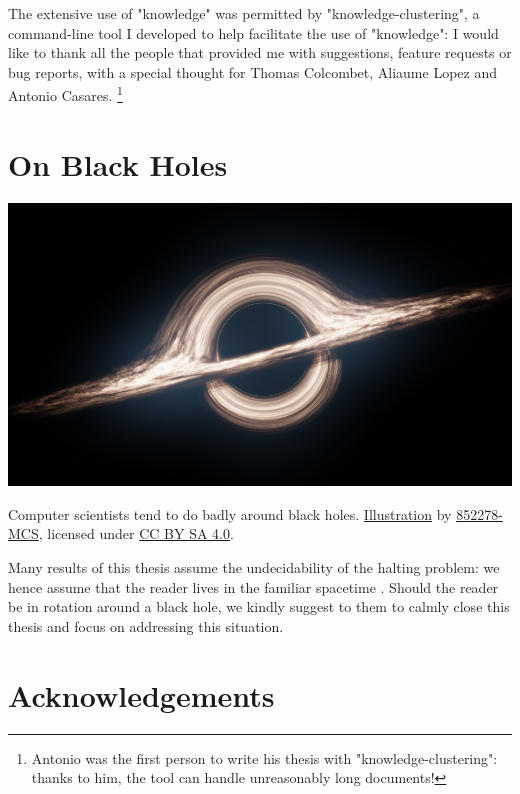 The extensive use of "knowledge" was permitted by "knowledge-clustering",
a command-line tool I developed to help facilitate the use of "knowledge":
I would like to thank all the people that provided me with suggestions,
feature requests or bug reports, with a special thought for Thomas Colcombet, Aliaume Lopez
and Antonio Casares.%
\footnote{Antonio was the first person to write his thesis
with "knowledge-clustering": thanks to him, the tool can handle
unreasonably long documents!}

\section*{On Black Holes}

\begin{marginfigure}
	\centering
	\includegraphics[width=\linewidth]{fig/intro/black-hole.png}
	\caption{
		Computer scientists tend to do badly around black holes.
		\href{https://commons.wikimedia.org/wiki/File:Black_Hole_Full.png}{Illustration}
		by \href{https://commons.wikimedia.org/wiki/User:852278-MCS}{852278-MCS},
		licensed under \href{https://creativecommons.org/licenses/by-sa/4.0/deed.en}{CC BY SA 4.0}.
	}
\end{marginfigure}
Many results of this thesis assume the undecidability of the halting problem:
we hence assume that the reader lives in the familiar spacetime \cite{Hogarth1994NonTuring}.
Should the reader be in rotation around a black hole, we kindly suggest
to them to calmly close this thesis and focus on addressing this situation.

\section*{Acknowledgements}

